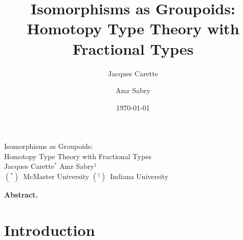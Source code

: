 \documentclass[11pt]{article}
\begin{document}
\begin{titlepage}
\begin{center}
\vfill
{\LARGE Isomorphisms as Groupoids: \\ 
  Homotopy Type Theory with Fractional Types} \\[1.5cm]
{\Large Jacques Carette${}^*$ \qquad Amr Sabry${}^{\dagger}$}\\[0.5cm]
{\Large $({}^*)$~McMaster University \qquad $({}^\dagger)$~Indiana University}
\vfill
\end{center}
\vfill
\noindent\textbf{Abstract.} 

\vfill
\vfill
\end{titlepage}

\title{Isomorphisms as Groupoids: \\ 
  Homotopy Type Theory with Fractional Types}
\author{Jacques Carette \and Amr Sabry}
\date{\today}
\maketitle

\section{Introduction}
\end{document}

